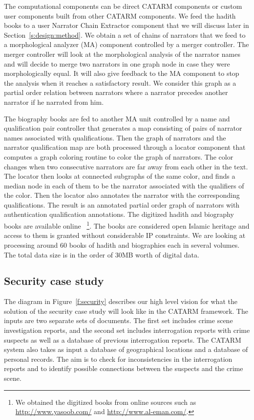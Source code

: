 \documentclass[12pt]{article}
\begin{document}
The computational components can be direct CATARM components
or custom user components built from other CATARM components.
We feed the hadith books to a user Narrator Chain Extractor
component that we will discuss later in 
Section~\ref{s:design:method}. We  obtain a set of chains
of narrators that we feed to a morphological analyzer (MA) 
component controlled by a merger controller. 
The merger controller will look at the morphological analysis
of the narrator names and will decide to merge two narrators in 
one graph node in case they were morphologically equal. 
It will also give feedback to the MA component to stop the
analysis when it reaches a satisfactory result.
We consider this graph as a partial order relation between 
narrators where a narrator precedes another narrator if 
he narrated from him. 

The biography books are fed to another MA unit controlled by 
a name and qualification pair controller that generates a 
map consisting of pairs of narrator names associated with 
qualifications. 
Then the graph of narrators and the narrator qualification map
are both processed through a locator component that computes
a graph coloring routine to color the graph of narrators. 
The color changes when two consecutive narrators are far away
from each other in the text. 
The locator then looks at connected subgraphs of the same color,
and finds a median node in each of them to be the narrator 
associated with the qualifiers of the color. 
Then the locator also annotates the narrator with the 
corresponding qualifications. 
The result is an annotated partial order graph of narrators
with authentication qualification annotations. 
The digitized hadith and biography books are available 
online~ \footnote{We obtained
  the digitized books from online sources such as 
  \href{http://www.yasoob.com/}{http://www.yasoob.com/} and 
  \href{http://www.al-eman.com/}{http://www.al-eman.com/}. }.
The books are considered open Islamic heritage and access to
them is granted without considerable IP constraints. 
We are looking at processing around 60 books of hadith and
biographies each in several volumes. 
The total data size is in the order of 30MB worth of digital 
data.

\subsection{Security case study}
\label{s:design:sec}



The diagram in Figure~\ref{f:security} describes our 
high level vision for what the solution of the 
security case study
will look like in the CATARM framework. 
The inputs are two separate sets of documents. 
The first set includes crime scene investigation reports, 
and the second set includes 
interrogation reports with crime suspects as well as 
a database of previous interrogation reports. 
The CATARM system also takes as input a database of geographical
locations and a database of personal records. 
The aim is to check for inconsistencies in the interrogation
reports and to identify possible connections between the suspects
and the crime scene. 
\end{document}
